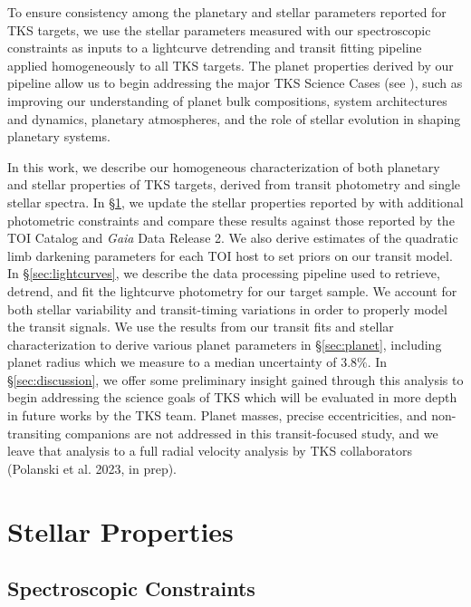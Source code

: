 \documentclass[twocolumn]{aastex63}
\begin{document}
To ensure consistency among the planetary and stellar parameters reported for TKS targets, we use the stellar parameters measured with our spectroscopic constraints as inputs to a lightcurve detrending and transit fitting pipeline applied homogeneously to all TKS targets. The planet properties derived by our pipeline allow us to begin addressing the major TKS Science Cases (see \citealt{Chontos22}), such as improving our understanding of planet bulk compositions, system architectures and dynamics, planetary atmospheres, and the role of stellar evolution in shaping planetary systems.

In this work, we describe our homogeneous characterization of both planetary and stellar properties of TKS targets, derived from transit photometry and single stellar spectra. In \S\ref{sec:stellar}, we update the stellar properties reported by \citealt{Chontos22} with additional photometric constraints and compare these results against those reported by the TOI Catalog and \textit{Gaia} Data Release 2. We also derive estimates of the quadratic limb darkening parameters for each TOI host to set priors on our transit model. In \S\ref{sec:lightcurves}, we describe the data processing pipeline used to retrieve, detrend, and fit the lightcurve photometry for our target sample. We account for both stellar variability and transit-timing variations in order to properly model the transit signals. We use the results from our transit fits and stellar characterization to derive various planet parameters in \S\ref{sec:planet}, including planet radius which we measure to a median uncertainty of 3.8$\%$. In \S\ref{sec:discussion}, we offer some preliminary insight gained through this analysis to begin addressing the science goals of TKS which will be evaluated in more depth in future works by the TKS team. Planet masses, precise eccentricities, and non-transiting companions are not addressed in this transit-focused study, and we leave that analysis to a full radial velocity analysis by TKS collaborators (Polanski et al. 2023, in prep).


\section{Stellar Properties}
\label{sec:stellar}

\subsection{Spectroscopic Constraints}
\label{sec:specmatch}
\end{document}

